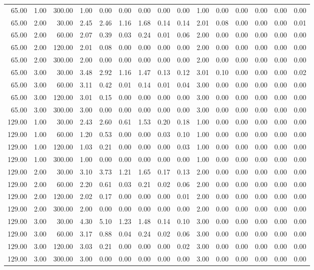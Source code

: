 \begin{table}[ht]
\begin{tabular}{rrrrrrrrrrrrrrr}
  65.00 & 1.00 & 300.00 & 1.00 & 0.00 & 0.00 & 0.00 & 0.00 & 0.00 & 1.00 & 0.00 & 0.00 & 0.00 & 0.00 & 0.00 \\ 
  65.00 & 2.00 & 30.00 & 2.45 & 2.46 & 1.16 & 1.68 & 0.14 & 0.14 & 2.01 & 0.08 & 0.00 & 0.00 & 0.00 & 0.01 \\ 
  65.00 & 2.00 & 60.00 & 2.07 & 0.39 & 0.03 & 0.24 & 0.01 & 0.06 & 2.00 & 0.00 & 0.00 & 0.00 & 0.00 & 0.00 \\ 
  65.00 & 2.00 & 120.00 & 2.01 & 0.08 & 0.00 & 0.00 & 0.00 & 0.00 & 2.00 & 0.00 & 0.00 & 0.00 & 0.00 & 0.00 \\ 
  65.00 & 2.00 & 300.00 & 2.00 & 0.00 & 0.00 & 0.00 & 0.00 & 0.00 & 2.00 & 0.00 & 0.00 & 0.00 & 0.00 & 0.00 \\ 
  65.00 & 3.00 & 30.00 & 3.48 & 2.92 & 1.16 & 1.47 & 0.13 & 0.12 & 3.01 & 0.10 & 0.00 & 0.00 & 0.00 & 0.02 \\ 
  65.00 & 3.00 & 60.00 & 3.11 & 0.42 & 0.01 & 0.14 & 0.01 & 0.04 & 3.00 & 0.00 & 0.00 & 0.00 & 0.00 & 0.00 \\ 
  65.00 & 3.00 & 120.00 & 3.01 & 0.15 & 0.00 & 0.00 & 0.00 & 0.00 & 3.00 & 0.00 & 0.00 & 0.00 & 0.00 & 0.00 \\ 
  65.00 & 3.00 & 300.00 & 3.00 & 0.00 & 0.00 & 0.00 & 0.00 & 0.00 & 3.00 & 0.00 & 0.00 & 0.00 & 0.00 & 0.00 \\ 
  129.00 & 1.00 & 30.00 & 2.43 & 2.60 & 0.61 & 1.53 & 0.20 & 0.18 & 1.00 & 0.00 & 0.00 & 0.00 & 0.00 & 0.00 \\ 
  129.00 & 1.00 & 60.00 & 1.20 & 0.53 & 0.00 & 0.00 & 0.03 & 0.10 & 1.00 & 0.00 & 0.00 & 0.00 & 0.00 & 0.00 \\ 
  129.00 & 1.00 & 120.00 & 1.03 & 0.21 & 0.00 & 0.00 & 0.00 & 0.03 & 1.00 & 0.00 & 0.00 & 0.00 & 0.00 & 0.00 \\ 
  129.00 & 1.00 & 300.00 & 1.00 & 0.00 & 0.00 & 0.00 & 0.00 & 0.00 & 1.00 & 0.00 & 0.00 & 0.00 & 0.00 & 0.00 \\ 
  129.00 & 2.00 & 30.00 & 3.10 & 3.73 & 1.21 & 1.65 & 0.17 & 0.13 & 2.00 & 0.00 & 0.00 & 0.00 & 0.00 & 0.00 \\ 
  129.00 & 2.00 & 60.00 & 2.20 & 0.61 & 0.03 & 0.21 & 0.02 & 0.06 & 2.00 & 0.00 & 0.00 & 0.00 & 0.00 & 0.00 \\ 
  129.00 & 2.00 & 120.00 & 2.02 & 0.17 & 0.00 & 0.00 & 0.00 & 0.01 & 2.00 & 0.00 & 0.00 & 0.00 & 0.00 & 0.00 \\ 
  129.00 & 2.00 & 300.00 & 2.00 & 0.00 & 0.00 & 0.00 & 0.00 & 0.00 & 2.00 & 0.00 & 0.00 & 0.00 & 0.00 & 0.00 \\ 
  129.00 & 3.00 & 30.00 & 4.30 & 5.10 & 1.23 & 1.48 & 0.14 & 0.10 & 3.00 & 0.00 & 0.00 & 0.00 & 0.00 & 0.00 \\ 
  129.00 & 3.00 & 60.00 & 3.17 & 0.88 & 0.04 & 0.24 & 0.02 & 0.06 & 3.00 & 0.00 & 0.00 & 0.00 & 0.00 & 0.00 \\ 
  129.00 & 3.00 & 120.00 & 3.03 & 0.21 & 0.00 & 0.00 & 0.00 & 0.02 & 3.00 & 0.00 & 0.00 & 0.00 & 0.00 & 0.00 \\ 
  129.00 & 3.00 & 300.00 & 3.00 & 0.00 & 0.00 & 0.00 & 0.00 & 0.00 & 3.00 & 0.00 & 0.00 & 0.00 & 0.00 & 0.00 \\ 
   \hline
\end{tabular}
\end{table}
